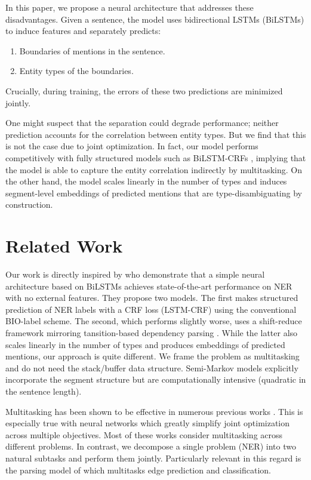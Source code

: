 \documentclass[11pt,letterpaper,UTF8]{article}
\begin{document}
In this paper, we propose a neural architecture that addresses these disadvantages.
Given a sentence, the model uses bidirectional LSTMs (BiLSTMs) to induce features and separately predicts:
\begin{enumerate}
\item Boundaries of mentions in the sentence.
\item Entity types of the boundaries.
\end{enumerate}
Crucially, during training, the errors of these two predictions are minimized jointly.

One might suspect that the separation could degrade performance;
neither prediction accounts for the correlation between entity types.
But we find that this is not the case due to joint optimization.
In fact, our model performs competitively with fully structured models such as BiLSTM-CRFs \cite{lample2016neural},
implying that the model is able to capture the entity correlation indirectly by multitasking.
On the other hand, the model scales linearly in the number of types
and induces segment-level embeddings of predicted mentions that are type-disambiguating by construction.

\section{Related Work}
\label{sec:related-work}

Our work is directly inspired by 
who demonstrate that a simple neural architecture based on BiLSTMs
achieves state-of-the-art performance on NER with no external features.
They propose two models.
The first makes structured prediction of NER labels with a CRF loss (LSTM-CRF)
using the conventional BIO-label scheme.
The second, which performs slightly worse, uses a shift-reduce framework mirroring tansition-based dependency parsing \cite{yamada2003statistical}.
While the latter also scales linearly in the number of types and produces embeddings of predicted mentions, our approach is quite different.
We frame the problem as multitasking and do not need the stack/buffer data structure.
Semi-Markov models \cite{kong2015segmental,sarawagi2004semi} explicitly incorporate the segment structure
but are computationally intensive (quadratic in the sentence length).%

Multitasking has been shown to be effective in numerous previous works \cite{collobert2011natural,yang2016multi,TACL885}.
This is especially true with neural networks which greatly simplify joint optimization across multiple objectives.
Most of these works consider multitasking across different problems.
In contrast, we decompose a single problem (NER) into two natural subtasks and perform them jointly.
Particularly relevant in this regard is the parsing model of  which multitasks edge prediction and classification.
\end{document}
